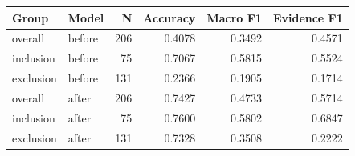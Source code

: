 \begin{tabular}{llrrrr}
\toprule
Group & Model & N & Accuracy & Macro F1 & Evidence F1 \\
\midrule
overall & before & 206 & 0.4078 & 0.3492 & 0.4571 \\
inclusion & before & 75 & 0.7067 & 0.5815 & 0.5524 \\
exclusion & before & 131 & 0.2366 & 0.1905 & 0.1714 \\
overall & after & 206 & 0.7427 & 0.4733 & 0.5714 \\
inclusion & after & 75 & 0.7600 & 0.5802 & 0.6847 \\
exclusion & after & 131 & 0.7328 & 0.3508 & 0.2222 \\
\bottomrule
\end{tabular}
